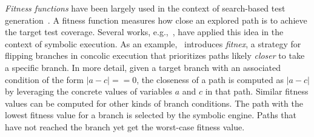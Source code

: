 

{\em Fitness functions} have been largely used in the context of search-based test generation~\cite{M-STVR04}. %
A fitness function measures how close an explored path is to achieve the target test coverage. Several works, e.g.,~\cite{XTD-DSN09,CS-CACM13}, have applied this idea in the context of symbolic execution. As an example,~\cite{XTD-DSN09} introduces {\em fitnex}, a strategy for flipping branches in concolic execution that prioritizes paths likely {\em closer} to take a specific branch.
In more detail, given a target branch with an associated condition of the form $|a - c| == 0$, the closeness of a path is computed as $|a - c|$ by leveraging the concrete values of variables $a$ and $c$ in that path. Similar fitness values can be computed for other kinds of branch conditions. The path with the lowest fitness value for a branch is selected by the symbolic engine. Paths that have not reached the branch yet get the worst-case fitness value. 

